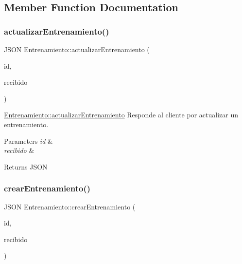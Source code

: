 \subsection{Member Function Documentation}
\mbox{\label{classEntrenamiento_a230ba578e3ecb690f966eb695f58fda4}} 
\subsubsection{\texorpdfstring{actualizar\+Entrenamiento()}{actualizarEntrenamiento()}}
{\footnotesize\ttfamily J\+S\+ON Entrenamiento\+::actualizar\+Entrenamiento (\begin{DoxyParamCaption}\item[{int}]{id,  }\item[{J\+S\+ON}]{recibido }\end{DoxyParamCaption})}



\mbox{\hyperlink{classEntrenamiento_a230ba578e3ecb690f966eb695f58fda4}{Entrenamiento\+::actualizar\+Entrenamiento}} Responde al cliente por actualizar un entrenamiento. 


\begin{DoxyParams}{Parameters}
{\em id} & \\
\hline
{\em recibido} & \\
\hline
\end{DoxyParams}
\begin{DoxyReturn}{Returns}
J\+S\+ON 
\end{DoxyReturn}
\mbox{\label{classEntrenamiento_ae9d4c8c7082016c354e627456c8f067c}} 
\subsubsection{\texorpdfstring{crear\+Entrenamiento()}{crearEntrenamiento()}}
{\footnotesize\ttfamily J\+S\+ON Entrenamiento\+::crear\+Entrenamiento (\begin{DoxyParamCaption}\item[{int}]{id,  }\item[{J\+S\+ON}]{recibido }\end{DoxyParamCaption})}



